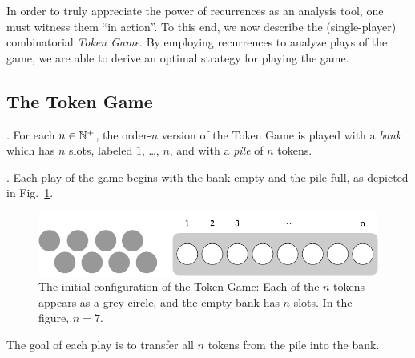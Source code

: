 In order to truly appreciate the power of recurrences as an analysis
tool, one must witness them ``in action''.  To this end, we now
describe the (single-player) combinatorial {\it Token Game}.  By
employing recurrences to analyze plays of the game, we are able to
derive an optimal strategy for playing the game.

\subsection{The Token Game}
\label{sec:TokenGame-Rules}

.
For each $n \in \mathbb{N}^+$, the order-$n$ version of the Token Game is
played with a {\it bank} which has $n$ slots, labeled $1$, \ldots,
$n$, and with a {\it pile} of $n$ tokens.

\medskip

.
Each play of the game begins with the bank empty and the pile full, as
depicted in Fig.~\ref{fig:jeujetonsInit}.
\begin{figure}[htb]
\begin{center}
        \includegraphics[scale=0.35]{FiguresMaths/GameTokenInit.png}
\caption{The initial configuration of the Token Game: Each of the $n$
  tokens appears as a grey circle, and the empty bank has $n$ slots.
  In the figure, $n=7$.}
        \label{fig:jeujetonsInit}
\end{center}
\end{figure}
The goal of each play is to transfer all $n$ tokens from the pile into
the bank.

\medskip

